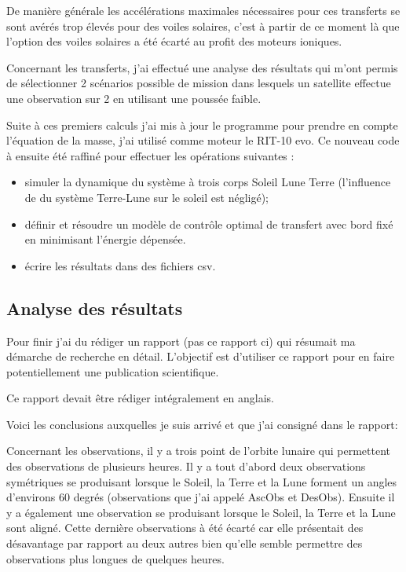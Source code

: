 \documentclass[12pt]{article} %
\begin{document}
		De manière générale les accélérations maximales nécessaires pour ces transferts se sont avérés trop élevés pour des voiles solaires, c'est à partir de ce moment là que l'option des voiles solaires a été écarté au profit des moteurs ioniques.	
		
		Concernant les transferts, j'ai effectué une analyse des résultats qui m'ont permis de sélectionner 2 scénarios possible de mission dans lesquels un satellite effectue une observation sur 2 en utilisant une poussée faible.
		
		Suite à ces premiers calculs j'ai mis à jour le programme pour prendre en compte l'équation de la masse, j'ai utilisé comme moteur le RIT-10 evo. Ce nouveau code à ensuite été raffiné pour effectuer les opérations suivantes : 
		
		\begin{itemize}
			\item simuler la dynamique du système à trois corps Soleil Lune Terre (l'influence de du système Terre-Lune sur le soleil est négligé);
			\item définir et résoudre un modèle de contrôle optimal de transfert avec bord fixé en minimisant l'énergie dépensée.
			\item écrire les résultats dans des fichiers csv.
		\end{itemize}
		\newpage
		\subsection{Analyse des résultats}
		
		Pour finir j'ai du rédiger un rapport (pas ce rapport ci) qui résumait ma démarche de recherche en détail. L'objectif est d'utiliser ce rapport pour en faire potentiellement une publication scientifique.
		
		Ce rapport devait être rédiger intégralement en anglais. 
		
		Voici les conclusions auxquelles je suis arrivé et que j'ai consigné dans le rapport: 
		
		Concernant les observations, il y a trois point de l'orbite lunaire qui permettent des observations de plusieurs heures. Il y a tout d'abord deux observations symétriques se produisant lorsque le Soleil, la Terre et la Lune forment un angles d'environs 60 degrés (observations que j'ai appelé \gls{AscObs} et \gls{DesObs}). Ensuite il y a également une observation se produisant lorsque le Soleil, la Terre et la Lune sont aligné. Cette dernière observations à été écarté car elle présentait des désavantage par rapport au deux autres bien qu'elle semble permettre des observations plus longues de quelques heures.
		
\end{document}
